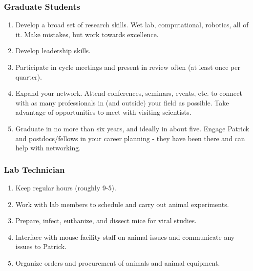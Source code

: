 \documentclass[10pt, a4paper, twocolumn]{article} %
\begin{document}
\subsubsection{Graduate Students}
\begin{enumerate}
\item Develop a broad set of research skills. Wet lab, computational, robotics, all of it. Make mistakes, but work towards excellence.
\item Develop leadership skills.
\item Participate in cycle meetings and present in review often (at least once per quarter).
\item Expand your network. Attend conferences, seminars, events, etc. to connect with as many professionals in (and outside) your field as possible. Take advantage of opportunities to meet with visiting scientists.
\item Graduate in no more than six years, and ideally in about five. Engage Patrick and postdocs/fellows in your career planning - they have been there and can help with networking.
\end{enumerate}
\subsubsection{Lab Technician}
\begin{enumerate}
\item Keep regular hours (roughly 9-5).
\item Work with lab members to schedule and carry out animal experiments.
\item Prepare, infect, euthanize, and dissect mice for viral studies.
\item Interface with mouse facility staff on animal issues and communicate any issues to Patrick.
\item Organize orders and procurement of animals and animal equipment.
\end{enumerate}
\end{document}
